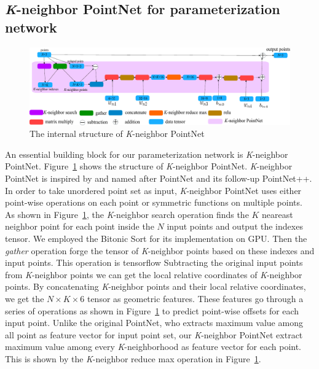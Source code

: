 \subsection{\textit{K}-neighbor PointNet for parameterization network} 
\label{subsec:k-n_point_net}

\begin{figure}[htbp]
	\centering
	\includegraphics[width=\linewidth]{img/net/k-n_pointnet}
	\caption{The internal structure of \textit{K}-neighbor PointNet}
	\label{fig:knpointnet}
\end{figure}

An essential building block for our parameterization network is \textit{K}-neighbor PointNet. Figure~\ref{fig:knpointnet} shows the structure of \textit{K}-neighbor PointNet. \textit{K}-neighbor PointNet is inspired by and named after PointNet\cite{PointNet} and its follow-up PointNet++\cite{NIPS2017_7095}. In order to take unordered point set as input, \textit{K}-neighbor PointNet uses either point-wise operations on each point or symmetric functions on multiple points. As shown in Figure~\ref{fig:knpointnet}, the \textit{K}-neighbor search operation finds the $K$ neareast neighbor point for each point inside the $N$ input points and output the indexes tensor. We employed the Bitonic Sort\cite{bitonicsorter} for its implementation on GPU. Then the  \emph{gather} operation forge the tensor of \textit{K}-neighbor points based on these indexes and input points. This operation is tensorflow  Subtracting the original input points from \textit{K}-neighbor points we can get the local relative coordinates of \textit{K}-neighbor points. By concatenating \textit{K}-neighbor points and their local relative coordinates, we get the $N\times K\times6$ tensor as geometric features. These features go through a series of operations as shown in Figure~\ref{fig:knpointnet} to predict point-wise offsets for each input point. Unlike the original PointNet\cite{PointNet}, who extracts maximum value among all point as feature vector for input point set, our \textit{K}-neighbor PointNet extract maximum value among every \textit{K}-neighborhood as feature vector for each point. This is shown by the \textit{K}-neighbor reduce max operation in Figure~\ref{fig:knpointnet}.

